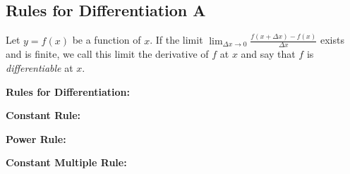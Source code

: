\subsection*{Rules for Differentiation A}

Let $y=f(x)$ be a function of $x$. If the limit $\displaystyle\lim_{\Delta x\to0}\frac{f(x+\Delta x)-f(x)}{\Delta x}$ exists and is finite, we call this limit the derivative of $f$ at $x$ and say that $f$ is \textit{differentiable} at $x$.

\noindent\textbf{Rules for Differentiation:}
\begin{questions}
    \question \textbf{Constant Rule:}
    
    \question \textbf{Power Rule:}
    
    \question \textbf{Constant Multiple Rule:}
\end{questions}
